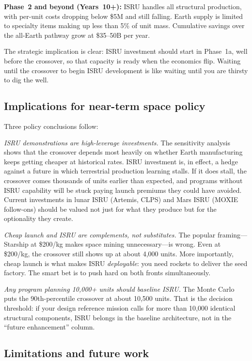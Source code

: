 \documentclass[preprint,12pt]{elsarticle}
\begin{document}
\textbf{Phase~2 and beyond (Years~10+):} ISRU handles all structural production, with per-unit costs dropping below \$5M and still falling. Earth supply is limited to specialty items making up less than 5\% of unit mass. Cumulative savings over the all-Earth pathway grow at \$35--50B per year.

The strategic implication is clear: ISRU investment should start in Phase~1a, well before the crossover, so that capacity is ready when the economics flip. Waiting until the crossover to begin ISRU development is like waiting until you are thirsty to dig the well.

\subsection{Implications for near-term space policy}

Three policy conclusions follow:

\emph{ISRU demonstrations are high-leverage investments.} The sensitivity analysis shows that the crossover depends most heavily on whether Earth manufacturing keeps getting cheaper at historical rates. ISRU investment is, in effect, a hedge against a future in which terrestrial production learning stalls. If it does stall, the crossover comes thousands of units earlier than expected, and programs without ISRU capability will be stuck paying launch premiums they could have avoided. Current investments in lunar ISRU (Artemis, CLPS) and Mars ISRU (MOXIE follow-ons) should be valued not just for what they produce but for the optionality they create.

\emph{Cheap launch and ISRU are complements, not substitutes.} The popular framing---Starship at \$200/kg makes space mining unnecessary---is wrong. Even at \$200/kg, the crossover still shows up at about 4{,}000 units. More importantly, cheap launch is what makes ISRU \emph{deployable}: you need rockets to deliver the seed factory. The smart bet is to push hard on both fronts simultaneously.

\emph{Any program planning 10{,}000+ units should baseline ISRU.} The Monte Carlo puts the 90th-percentile crossover at about 10{,}500 units. That is the decision threshold: if your design reference mission calls for more than 10{,}000 identical structural components, ISRU belongs in the baseline architecture, not in the ``future enhancement'' column.

\subsection{Limitations and future work}
\end{document}
